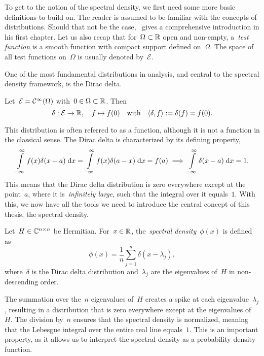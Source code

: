 To get to the notion of the spectral density, we first need some more basic definitions to build on.
The reader is assumed to be familiar with the concepts of distributions. Should that not be the case,~\cite{strichartz} gives a comprehensive introduction in his first chapter. Let us also recap that for~$\Omega \subset \mathbb{R}$ open and non-empty, a~\emph{test function} is a smooth function with compact support defined on~$\Omega$. The space of all test functions on~$\Omega$ is usually denoted by~$\mathcal{E}$.

One of the most fundamental distributions in analysis, and central to the spectral density framework, is the Dirac delta.

\begin{definition}
    Let~$\mathcal{E} = \mathcal{C}^{\infty}(\Omega)$ with~$0 \in \Omega \subset \mathbb{R}$.
    Then
    \[
    \delta: \mathcal{E} \to \mathbb{R}, \quad f \mapsto f(0) \quad \text{with} \quad \langle \delta, f \rangle := \delta(f) = f(0).
    \]
\end{definition}
\noindent
This distribution is often referred to as a function, although it is not a function in the classical sense. The Dirac delta is characterized by its defining property,
\[
\int\limits_{-\infty}^{\infty} f(x) \delta(x-a) \;\mathrm{d}x = \int\limits_{-\infty}^{\infty} f(x) \delta(a-x) \;\mathrm{d}x = f(a) \implies \int\limits_{-\infty}^{\infty} \delta(x-a) \;\mathrm{d}x = 1.
\]
This means that the Dirac delta distribution is zero everywhere except at the point~$a$, where it is~\emph{infinitely large}, such that the integral over it equals~$1$. With this, we now have all the tools we need to introduce the central concept of this thesis, the spectral density.

\begin{definition}
    Let~$H \in \mathbb{C}^{n \times n}$ be Hermitian. For~$x \in \mathbb{R}$, the~\emph{spectral density}~$\phi(x)$ is defined as
    \[
    \phi(x) = \frac{1}{n} \sum_{j=1}^{n} \delta(x - \lambda_j),
    \]
    where~$\delta$ is the Dirac delta distribution and~$\lambda_j$ are the eigenvalues of~$H$ in non-descending order.
\end{definition}

The summation over the~$n$ eigenvalues of~$H$ creates a spike at each eigenvalue~$\lambda_j$, resulting in a distribution that is zero everywhere except at the eigenvalues of~$H$. The division by~$n$ ensures that the spectral density is normalized, meaning that the Lebesgue integral over the entire real line equals~$1$. This is an important property, as it allows us to interpret the spectral density as a probability density function.

